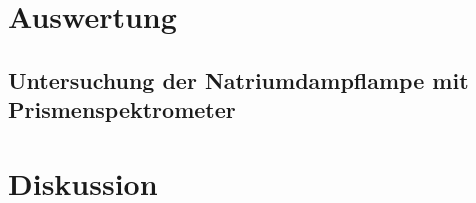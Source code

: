 \section{Auswertung}
\subsection{Untersuchung der Natriumdampflampe mit Prismenspektrometer}

\newpage
\section{Diskussion} 
